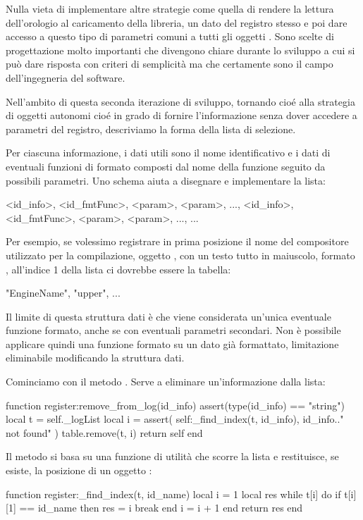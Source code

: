 Nulla vieta di implementare altre strategie come quella di rendere la lettura
dell'orologio al caricamento della libreria, un dato del registro stesso e poi
dare accesso a questo tipo di parametri comuni a tutti gli oggetti .
Sono scelte di progettazione molto importanti che divengono chiare durante lo
sviluppo a cui si può dare risposta con criteri di semplicità ma che certamente
sono il campo dell'ingegneria del software.

Nell'ambito di questa seconda iterazione di sviluppo, tornando cioé alla
strategia di oggetti  autonomi cioé in grado di fornire l'informazione
senza dover accedere a parametri del registro, descriviamo la forma
della lista di selezione.

Per ciascuna informazione, i dati utili sono il nome identificativo e i dati di
eventuali funzioni di formato composti dal nome della funzione seguito da
possibili parametri. Uno schema aiuta a disegnare e implementare la lista:
\begin{lines}
{
    { <id_info>, <id_fmtFunc>, <param>, <param>, ...},
    { <id_info>, <id_fmtFunc>, <param>, <param>, ...},
    ...
}
\end{lines}

Per esempio, se volessimo registrare in prima posizione il nome del compositore
utilizzato per la compilazione, oggetto , con un testo tutto in
maiuscolo, formato , all'indice 1 della lista  ci
dovrebbe essere la tabella:
\begin{lines}
{
    {"EngineName", "upper"},
    ...
}
\end{lines}

Il limite di questa struttura dati è che viene considerata un'unica eventuale
funzione formato, anche se con eventuali parametri secondari. Non è possibile
applicare quindi una funzione formato su un dato già formattato, limitazione
eliminabile modificando la struttura dati.

Cominciamo con il metodo . Serve a eliminare
un'informazione dalla lista:
\begin{lines}
function register:remove_from_log(id_info)
    assert(type(id_info) == "string")
    local t = self._logList
    local i = assert(
        self:_find_index(t, id_info), id_info.." not found"
    )
    table.remove(t, i)
    return self
end
\end{lines}

Il metodo si basa su una funzione di utilità  che scorre la
lista e restituisce, se esiste, la posizione di un oggetto :
\begin{lines}
function register:_find_index(t, id_name)
    local i = 1
    local res
    while t[i] do
        if t[i][1] == id_name then
            res = i
            break
        end
        i = i + 1
    end
    return res
end
\end{lines}

